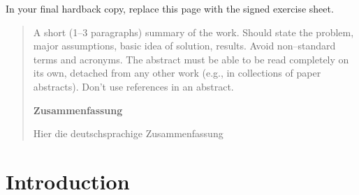 \documentclass[a4paper,twoside, openright,12pt]{report}
\begin{document}
\phantom{u}
\phantom{1}\vspace{6cm}
\begin{center}
In your final hardback copy, replace this page with the signed exercise sheet.
\end{center}

\newpage


\phantom{u}
\begin{abstract}
  A short (1--3 paragraphs) summary of the work. Should state the problem, major assumptions, basic idea of solution, results. Avoid non--standard terms and acronyms. The abstract must be able to be read completely on its own, detached from any other work (e.g., in collections of paper abstracts). Don't use references in an abstract.
\begin{center}	
\normalsize \textbf{Zusammenfassung}\\
\end{center}
Hier die deutschsprachige Zusammenfassung
\end{abstract}

\newpage

\phantom{u}
\phantom{1}\vspace{6cm}
\begin{center}
\end{center}



\pagestyle{fancy}

\tableofcontents 



\chapter{Introduction}
\end{document}

